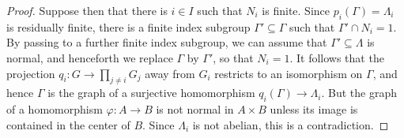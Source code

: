 \begin{proof}
Suppose then that there is $i\in I$ such that $N_i$ is finite. Since $p_i(\Gamma)=\Lambda_i$ is residually finite, there is a finite index subgroup $\Gamma'\subseteq \Gamma$ such that $\Gamma'\cap N_i=1$. By passing to a further finite index subgroup, we can assume that $\Gamma'\subseteq\Lambda$ is normal, and henceforth we replace $\Gamma$ by $\Gamma'$, so that $N_i=1$. It follows that the projection $q_i:G\to \prod_{j\neq i} G_j$ away from $G_i$ restricts to an isomorphism on $\Gamma$, and hence $\Gamma$ is the graph of a surjective homomorphism $q_i(\Gamma)\to \Lambda_i$. But the graph of a homomorphism $\varphi:A\to B$ is not normal in $A\times B$ unless its image is contained in the center of $B$. Since $\Lambda_i$ is not abelian, this is a contradiction.
\end{proof}

